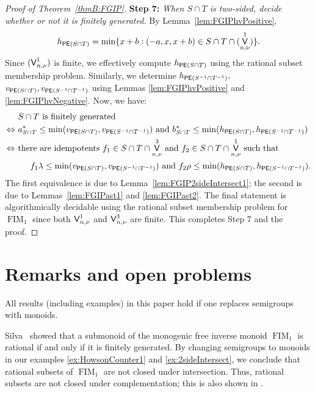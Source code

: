 \documentclass[reqno]{amsart}
\theoremstyle{plain}
\theoremstyle{definition}
\DeclareMathOperator{\FIM}{FIM}
\let\P\relax
\DeclareMathOperator{\P}{\textup{\textsf{P}}}
\DeclareMathOperator{\PE}{\textup{\textsf{PE}}}
\DeclareMathOperator{\V}{\textup{\textsf{V}}}
\numberwithin{equation}{section}
\begin{document}
\begin{proof}[Proof of Theorem~\ref{thmB:FGIP}]
\noindent\textbf{Step 7:} \textit{When $S\cap T$ is two-sided, decide whether or not it is finitely generated.}
By Lemma~\ref{lem:FGIPhvPositive}, 
\[
h_{\PE(S\cap T)} = \min\{x+b:(-a, x, x+b)\in S\cap T\cap \P(\V_{n,\nu}^1)\}.
\]
Since $\P(\V_{n,\nu}^1)$ is finite, we effectively compute $h_{\PE(S\cap T)}$ using the rational subset membership problem. Similarly, we determine $h_{\PE(S^{-1}\cap T^{-1})},$ $v_{\PE(S\cap T)}, v_{\PE(S^{-1}\cap T^{-1})}$ using Lemmas \ref{lem:FGIPhvPositive} and \ref{lem:FGIPhvNegative}.
Now, we have: 
\begin{align*}
    &S\cap T \text{ is finitely generated}\\
    \Leftrightarrow\ & a_{S\cap T}^\ast \leq \min(v_{\PE(S\cap T)}, v_{\PE(S^{-1}\cap T^{-1})}) \text{ and } b_{S\cap T}^\ast \leq \min(h_{\PE(S\cap T)}, h_{\PE(S^{-1}\cap T^{-1})})\\
    \Leftrightarrow\ & \text{there are idempotents $f_1\in S\cap T\cap \V_{n,\nu}^3$ and $f_2\in S\cap T \cap \V_{n,\nu}^1$ such that}\\
    &\quad\;\, f_1\lambda \leq \min(v_{\PE(S\cap T)}, v_{\PE(S^{-1}\cap T^{-1})}) \text{ and } f_2\rho \leq \min(h_{\PE(S\cap T)}, h_{\PE(S^{-1}\cap T^{-1})}).
\end{align*}
The first equivalence is due to Lemma~\ref{lem:FGIP2sideIntersect1}; the second is due to Lemmas~\ref{lem:FGIPast1} and \ref{lem:FGIPast2}. The final statement is
algorithmically decidable using the rational subset membership problem for $\FIM_1$ since both $\V_{n,\nu}^1$ and $\V_{n,\nu}^3$ are finite. This completes Step 7 and the proof.
\end{proof}


\section{Remarks and open problems}
\label{sec:RemarkOpen}

All results (including examples) in this paper hold if one replaces semigroups with monoids. 

Silva~\cite[Theorem 7.3]{SilvaRationalSubset} showed that a submonoid of the monogenic free inverse monoid $\FIM_1$ is rational if and only if it is finitely generated. By changing semigroups to monoids in our examples \ref{ex:HowsonCounter1} and \ref{ex:2sideIntersect}, we conclude that rational subsets of $\FIM_1$ are not closed under intersection. Thus, rational subsets are not closed under complementation; this is also shown in \cite[Example 5.5]{SilvaRationalSubset}.
\end{document}
